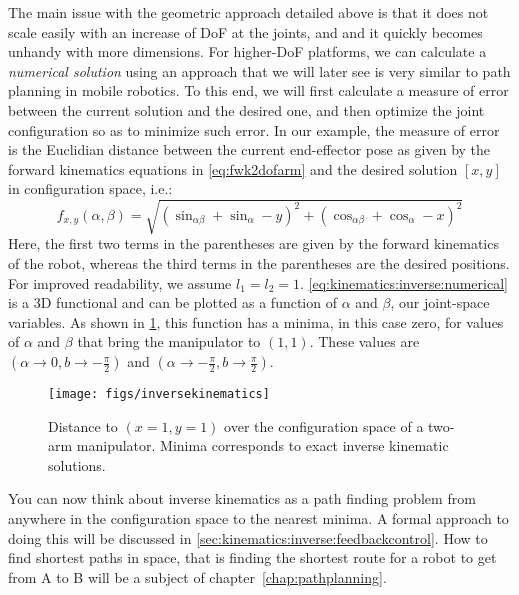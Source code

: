 The main issue with the geometric approach detailed above is that it does not scale easily with an increase of DoF at the joints, and and it quickly becomes unhandy with more dimensions.
For higher-DoF platforms, we can calculate a \textsl{numerical solution} using an approach that we will later see is very similar to path planning in mobile robotics.
To this end, we will first calculate a measure of error between the current solution and the desired one, and then optimize the joint configuration so as to minimize such error.
In our example, the measure of error is the Euclidian distance between the current end-effector pose as given by the forward kinematics equations in \cref{eq:fwk2dofarm} and the desired solution $[x,y]$ in configuration space, i.e.:
\begin{equation}\label{eq:kinematics:inverse:numerical}
f_{x,y}(\alpha,\beta)=\sqrt{\left(\sin_{\alpha\beta} + \sin_\alpha - y\right)^2 + \left(\cos_{\alpha\beta}+\cos_\alpha - x\right)^2}
\end{equation}
Here, the first two terms in the parentheses are given by the forward kinematics of the robot, whereas the third terms in the parentheses are the desired positions. For improved readability, we assume $l_1=l_2=1$.
\cref{eq:kinematics:inverse:numerical} is a 3D functional and can be plotted as a function of $\alpha$ and $\beta$, our joint-space variables.
As shown in \cref{fig:inversekinematics}, this function has a minima, in this case zero, for values of $\alpha$ and $\beta$ that bring the manipulator to $(1,1)$. These values are $(\alpha \rightarrow 0, b \rightarrow -\frac{\pi}{2})$ and $(\alpha \rightarrow -\frac{\pi}{2}, b \rightarrow \frac{\pi}{2})$.

\begin{figure}
    \centering
        \texttt{[image: figs/inversekinematics]}
    \caption{Distance to $(x=1,y=1)$ over the configuration space of a two-arm manipulator. Minima corresponds to exact inverse kinematic solutions.}
    \label{fig:inversekinematics}
\end{figure}

You can now think about inverse kinematics as a path finding problem from anywhere in the configuration space to the nearest minima. A formal approach to doing this will be discussed in \cref{sec:kinematics:inverse:feedbackcontrol}. How to find shortest paths in space, that is finding the shortest route for a robot to get from A to B will be a subject of chapter~\ref{chap:pathplanning}.

